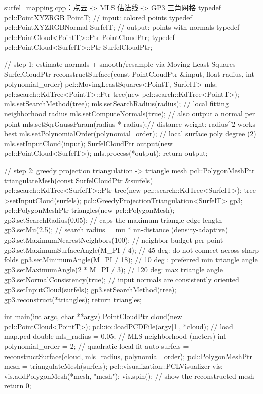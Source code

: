 \begin{codebox}[C++]{surfel\_mapping.cpp：点云 -> MLS 估法线 -> GP3 三角网格}
typedef pcl::PointXYZRGB        PointT;        // input: colored points
typedef pcl::PointXYZRGBNormal  SurfelT;       // output: points with normals
typedef pcl::PointCloud<PointT>::Ptr   PointCloudPtr;
typedef pcl::PointCloud<SurfelT>::Ptr  SurfelCloudPtr;

// step 1: estimate normals + smooth/resample via Moving Least Squares
SurfelCloudPtr reconstructSurface(const PointCloudPtr &input,
                                  float radius, int polynomial_order) {
  pcl::MovingLeastSquares<PointT, SurfelT> mls;
  pcl::search::KdTree<PointT>::Ptr tree(new pcl::search::KdTree<PointT>);
  mls.setSearchMethod(tree);
  mls.setSearchRadius(radius);          // local fitting neighborhood radius
  mls.setComputeNormals(true);          // also output a normal per point
  mls.setSqrGaussParam(radius * radius);// distance weight: radius^2 works best
  mls.setPolynomialOrder(polynomial_order);  // local surface poly degree (2)
  mls.setInputCloud(input);
  SurfelCloudPtr output(new pcl::PointCloud<SurfelT>);
  mls.process(*output);
  return output;
}

// step 2: greedy projection triangulation -> triangle mesh
pcl::PolygonMeshPtr triangulateMesh(const SurfelCloudPtr &surfels) {
  pcl::search::KdTree<SurfelT>::Ptr tree(new pcl::search::KdTree<SurfelT>);
  tree->setInputCloud(surfels);
  pcl::GreedyProjectionTriangulation<SurfelT> gp3;
  pcl::PolygonMeshPtr triangles(new pcl::PolygonMesh);
  gp3.setSearchRadius(0.05);            // caps the maximum triangle edge length
  gp3.setMu(2.5);                       // search radius = mu * nn-distance (density-adaptive)
  gp3.setMaximumNearestNeighbors(100);  // neighbor budget per point
  gp3.setMaximumSurfaceAngle(M_PI / 4); // 45 deg: do not connect across sharp folds
  gp3.setMinimumAngle(M_PI / 18);       // 10 deg : preferred min triangle angle
  gp3.setMaximumAngle(2 * M_PI / 3);    // 120 deg: max triangle angle
  gp3.setNormalConsistency(true);       // input normals are consistently oriented
  gp3.setInputCloud(surfels);
  gp3.setSearchMethod(tree);
  gp3.reconstruct(*triangles);
  return triangles;
}

int main(int argc, char **argv) {
  PointCloudPtr cloud(new pcl::PointCloud<PointT>);
  pcl::io::loadPCDFile(argv[1], *cloud);          // load map.pcd
  double mls_radius = 0.05;                        // MLS neighborhood (meters)
  int    polynomial_order = 2;                     // quadratic local fit
  auto surfels = reconstructSurface(cloud, mls_radius, polynomial_order);
  pcl::PolygonMeshPtr mesh = triangulateMesh(surfels);
  pcl::visualization::PCLVisualizer vis;
  vis.addPolygonMesh(*mesh, "mesh"); vis.spin();   // show the reconstructed mesh
  return 0;
}
\end{codebox}


